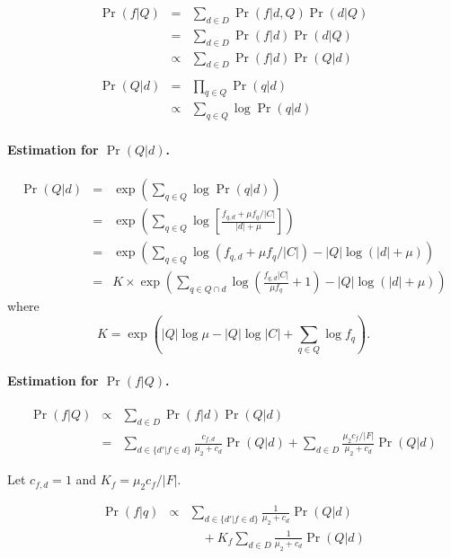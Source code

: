 \begin{eqnarray}
  \Pr(f|Q) &=& \sum_{d \in D} \Pr(f|d,Q) \Pr(d|Q) \nonumber\\
  &=& \sum_{d \in D} \Pr(f|d) \Pr(d|Q) \nonumber\\
  &\propto& \sum_{d \in D} \Pr(f|d) \Pr(Q|d) \label{eq:pr(f|Q)}\\
  && \nonumber\\
  \Pr(Q|d) &=& \prod_{q \in Q} \Pr(q|d) \nonumber\\
  &\propto& \sum_{q \in Q} \log \Pr(q|d) \label{eq:pr(Q|d)}
\end{eqnarray}

\paragraph{Estimation for $\Pr(Q|d)$.}

\begin{eqnarray}
  \Pr(Q|d) &=& \exp \left(\sum_{q \in Q} \log \Pr(q|d) \right) \nonumber\\
  &=& \exp \left(\sum_{q \in Q} \log \left[ \frac{f_{q,d} + \mu f_q / |C|}{|d| + \mu} \right] \right) \nonumber\\
  &=& \exp \left(\sum_{q \in Q} \log \left( f_{q,d} + \mu f_q / |C| \right) - |Q| \log \left( |d| + \mu \right) \right) \nonumber\\
  &=& K \times \exp \left( \sum_{q \in Q \cap d} \log \left( \frac{f_{q,d} |C|}{\mu f_q} + 1 \right) 
  - |Q| \log \left( |d| + \mu \right) \right) 
\end{eqnarray}
where \[ K = \exp \left( |Q| \log \mu - |Q| \log |C| + \sum_{q \in Q} \log f_q \right). \]

\paragraph{Estimation for $\Pr(f|Q)$.}

\begin{eqnarray}
  \Pr(f|Q) &\propto& \sum_{d \in D} \Pr(f|d) \Pr(Q|d) \nonumber\\
  &=& \sum_{d \in \{d'|f \in d\}} \frac{c_{f,d}}{\mu_2 + c_d} \Pr(Q|d) + \sum_{d \in D} \frac{\mu_2 c_f / |F|}{\mu_2 + c_d} \Pr(Q|d)
\end{eqnarray}

Let $c_{f,d} = 1$ and $K_f = \mu_2 c_f/|F|$.

\begin{eqnarray}
  \Pr(f|q) &\propto& \sum_{d \in \{d'|f \in d\}} \frac{1}{\mu_2 + c_d} \Pr(Q|d) \\
  && \quad + K_f \sum_{d \in D} \frac{1}{\mu_2 + c_d} \Pr(Q|d)
\end{eqnarray}


